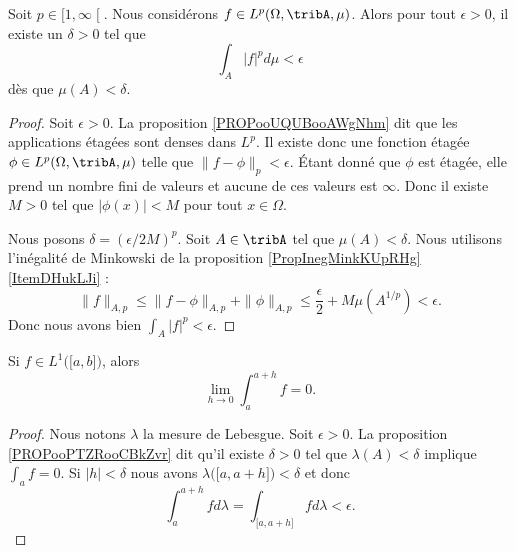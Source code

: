 \begin{proposition}	\label{PROPooPTZRooCBkZvr}
	Soit \( p\in \mathopen[ 1,\infty\mathclose[\). Nous considérons \( f\in L^p(\Omega,\tribA,\mu)\). Alors pour tout \( \epsilon>0\), il existe un \( \delta>0\) tel que
	\begin{equation}
		\int_A| f |^pd\mu<\epsilon
	\end{equation}
	dès que \( \mu(A)<\delta\).
\end{proposition}

\begin{proof}
	Soit \( \epsilon>0\). La proposition \ref{PROPooUQUBooAWgNhm} dit que les applications étagées sont denses dans \( L^p\). Il existe donc une fonction étagée \( \phi\in L^p(\Omega,\tribA,\mu)\) telle que \( \| f-\phi \|_p<\epsilon\). Étant donné que \( \phi\) est étagée, elle prend un nombre fini de valeurs et aucune de ces valeurs est \( \infty\). Donc il existe \( M>0\) tel que \( | \phi(x) |<M\) pour tout \( x\in \Omega\).

	Nous posons \( \delta=(\epsilon/2M)^p\). Soit \( A\in\tribA\) tel que \( \mu(A)<\delta\). Nous utilisons l'inégalité de Minkowski de la proposition \ref{PropInegMinkKUpRHg}\ref{ItemDHukLJi} :
	\begin{equation}
		\| f \|_{A,p}\leq\| f-\phi \|_{A,p}+\| \phi \|_{A,p}\leq \frac{ \epsilon }{2}+M\mu(A^{1/p})<\epsilon.
	\end{equation}
	Donc nous avons bien \( \int_A| f |^p<\epsilon\).
\end{proof}

\begin{corollary}	\label{CORooSGMXooCNfGNk}
	Si \( f\in L^1\big( \mathopen[ a,b\mathclose] \big)\), alors
	\begin{equation}
		\lim_{h\to 0}\int_a^{a+h}f=0.
	\end{equation}
\end{corollary}

\begin{proof}
	Nous notons \( \lambda\) la mesure de Lebesgue. Soit \( \epsilon>0\). La proposition \ref{PROPooPTZRooCBkZvr} dit qu'il existe \( \delta>0\) tel que \( \lambda(A)<\delta\) implique \( \int_af=0\). Si \( | h |<\delta\) nous avons \( \lambda\big( \mathopen[ a,a+h\mathclose] \big)<\delta \) et donc
	\begin{equation}
		\int_a^{a+h}fd\lambda=\int_{\mathopen[ a,a+h\mathclose]}fd\lambda<\epsilon.
	\end{equation}
\end{proof}

